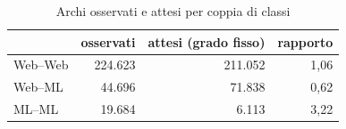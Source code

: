 \begin{table}[H]
\centering
\caption{Archi osservati e attesi per coppia di classi}
\label{tab:omofilia}
\begin{tabular}{lrrr}
\toprule
 & osservati & attesi (grado fisso) & rapporto \\
\midrule
Web–Web & 224.623 & 211.052 & 1,06 \\
Web–ML & 44.696 & 71.838 & 0,62 \\
ML–ML & 19.684 & 6.113 & 3,22 \\
\bottomrule
\end{tabular}
\end{table}
